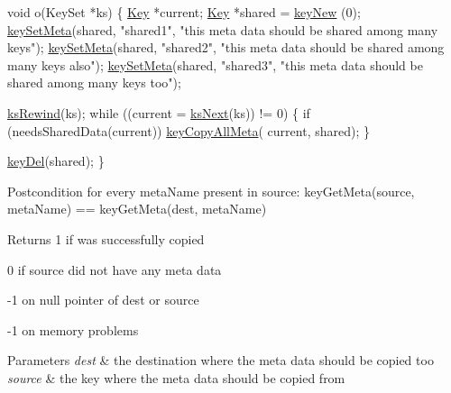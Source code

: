 \begin{DoxyCodeInclude}
\textcolor{keywordtype}{void} o(KeySet *ks)
\{
        \hyperlink{classkdb_1_1Key_a5679f5cae63caddd64a60388b9cc77fa}{Key} *current;
        \hyperlink{classkdb_1_1Key_a5679f5cae63caddd64a60388b9cc77fa}{Key} *shared = \hyperlink{group__key_gad23c65b44bf48d773759e1f9a4d43b89}{keyNew} (0);
        \hyperlink{group__keymeta_gae1f15546b234ffb6007d8a31178652b9}{keySetMeta}(shared, \textcolor{stringliteral}{"shared1"}, \textcolor{stringliteral}{"this meta data should be
       shared among many keys"});
        \hyperlink{group__keymeta_gae1f15546b234ffb6007d8a31178652b9}{keySetMeta}(shared, \textcolor{stringliteral}{"shared2"}, \textcolor{stringliteral}{"this meta data should be
       shared among many keys also"});
        \hyperlink{group__keymeta_gae1f15546b234ffb6007d8a31178652b9}{keySetMeta}(shared, \textcolor{stringliteral}{"shared3"}, \textcolor{stringliteral}{"this meta data should be
       shared among many keys too"});

        \hyperlink{group__keyset_gabe793ff51f1728e3429c84a8a9086b70}{ksRewind}(ks);
        \textcolor{keywordflow}{while} ((current = \hyperlink{group__keyset_ga317321c9065b5a4b3e33fe1c399bcec9}{ksNext}(ks)) != 0)
        \{
                \textcolor{keywordflow}{if} (needsSharedData(current)) \hyperlink{group__keymeta_ga8e63720a65610a29597494d0671f9401}{keyCopyAllMeta}(
      current, shared);
        \}

        \hyperlink{group__key_ga3df95bbc2494e3e6703ece5639be5bb1}{keyDel}(shared);
\}
\end{DoxyCodeInclude}
 \begin{DoxyPostcond}{Postcondition}
for every meta\-Name present in source\-: key\-Get\-Meta(source, meta\-Name) == key\-Get\-Meta(dest, meta\-Name)
\end{DoxyPostcond}
\begin{DoxyReturn}{Returns}
1 if was successfully copied 

0 if source did not have any meta data 

-\/1 on null pointer of dest or source 

-\/1 on memory problems 
\end{DoxyReturn}

\begin{DoxyParams}{Parameters}
{\em dest} & the destination where the meta data should be copied too \\
\hline
{\em source} & the key where the meta data should be copied from \\
\hline
\end{DoxyParams}


